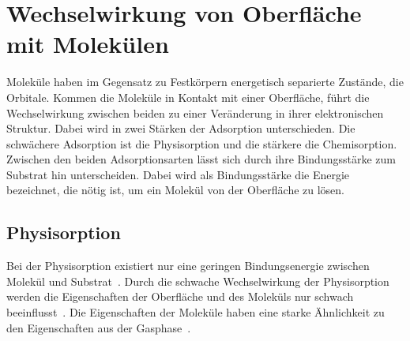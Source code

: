     \section{Wechselwirkung von Oberfläche mit Molekülen} \label{sec:WW}
        Moleküle haben im Gegensatz zu Festkörpern energetisch separierte Zustände, die Orbitale.
        Kommen die Moleküle in Kontakt mit einer Oberfläche, führt die Wechselwirkung zwischen beiden zu einer Veränderung in ihrer elektronischen Struktur.
        Dabei wird in zwei Stärken der Adsorption unterschieden.
        Die schwächere Adsorption ist die Physisorption und die stärkere die Chemisorption. %
        Zwischen den beiden Adsorptionsarten lässt sich durch ihre Bindungsstärke zum Substrat hin unterscheiden.
        Dabei wird als Bindungsstärke die Energie bezeichnet, die nötig ist, um ein Molekül von der Oberfläche zu lösen.
        
        \subsection{Physisorption}
            Bei der Physisorption existiert nur eine geringen Bindungsenergie zwischen Molekül und Substrat~\cite{IF_16}. 
            Durch die schwache Wechselwirkung der Physisorption werden die Eigenschaften der Oberfläche und des Moleküls nur schwach beeinflusst~\cite{bergenti_spinterface_2019}.
            Die Eigenschaften der Moleküle haben eine starke Ähnlichkeit zu den Eigenschaften aus der Gasphase~\cite{IF_16}.

